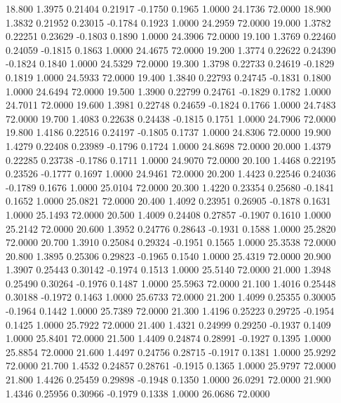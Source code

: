   18.800   1.3975   0.21404   0.21917  -0.1750   0.1965   1.0000  24.1736  72.0000
  18.900   1.3832   0.21952   0.23015  -0.1784   0.1923   1.0000  24.2959  72.0000
  19.000   1.3782   0.22251   0.23629  -0.1803   0.1890   1.0000  24.3906  72.0000
  19.100   1.3769   0.22460   0.24059  -0.1815   0.1863   1.0000  24.4675  72.0000
  19.200   1.3774   0.22622   0.24390  -0.1824   0.1840   1.0000  24.5329  72.0000
  19.300   1.3798   0.22733   0.24619  -0.1829   0.1819   1.0000  24.5933  72.0000
  19.400   1.3840   0.22793   0.24745  -0.1831   0.1800   1.0000  24.6494  72.0000
  19.500   1.3900   0.22799   0.24761  -0.1829   0.1782   1.0000  24.7011  72.0000
  19.600   1.3981   0.22748   0.24659  -0.1824   0.1766   1.0000  24.7483  72.0000
  19.700   1.4083   0.22638   0.24438  -0.1815   0.1751   1.0000  24.7906  72.0000
  19.800   1.4186   0.22516   0.24197  -0.1805   0.1737   1.0000  24.8306  72.0000
  19.900   1.4279   0.22408   0.23989  -0.1796   0.1724   1.0000  24.8698  72.0000
  20.000   1.4379   0.22285   0.23738  -0.1786   0.1711   1.0000  24.9070  72.0000
  20.100   1.4468   0.22195   0.23526  -0.1777   0.1697   1.0000  24.9461  72.0000
  20.200   1.4423   0.22546   0.24036  -0.1789   0.1676   1.0000  25.0104  72.0000
  20.300   1.4220   0.23354   0.25680  -0.1841   0.1652   1.0000  25.0821  72.0000
  20.400   1.4092   0.23951   0.26905  -0.1878   0.1631   1.0000  25.1493  72.0000
  20.500   1.4009   0.24408   0.27857  -0.1907   0.1610   1.0000  25.2142  72.0000
  20.600   1.3952   0.24776   0.28643  -0.1931   0.1588   1.0000  25.2820  72.0000
  20.700   1.3910   0.25084   0.29324  -0.1951   0.1565   1.0000  25.3538  72.0000
  20.800   1.3895   0.25306   0.29823  -0.1965   0.1540   1.0000  25.4319  72.0000
  20.900   1.3907   0.25443   0.30142  -0.1974   0.1513   1.0000  25.5140  72.0000
  21.000   1.3948   0.25490   0.30264  -0.1976   0.1487   1.0000  25.5963  72.0000
  21.100   1.4016   0.25448   0.30188  -0.1972   0.1463   1.0000  25.6733  72.0000
  21.200   1.4099   0.25355   0.30005  -0.1964   0.1442   1.0000  25.7389  72.0000
  21.300   1.4196   0.25223   0.29725  -0.1954   0.1425   1.0000  25.7922  72.0000
  21.400   1.4321   0.24999   0.29250  -0.1937   0.1409   1.0000  25.8401  72.0000
  21.500   1.4409   0.24874   0.28991  -0.1927   0.1395   1.0000  25.8854  72.0000
  21.600   1.4497   0.24756   0.28715  -0.1917   0.1381   1.0000  25.9292  72.0000
  21.700   1.4532   0.24857   0.28761  -0.1915   0.1365   1.0000  25.9797  72.0000
  21.800   1.4426   0.25459   0.29898  -0.1948   0.1350   1.0000  26.0291  72.0000
  21.900   1.4346   0.25956   0.30966  -0.1979   0.1338   1.0000  26.0686  72.0000
